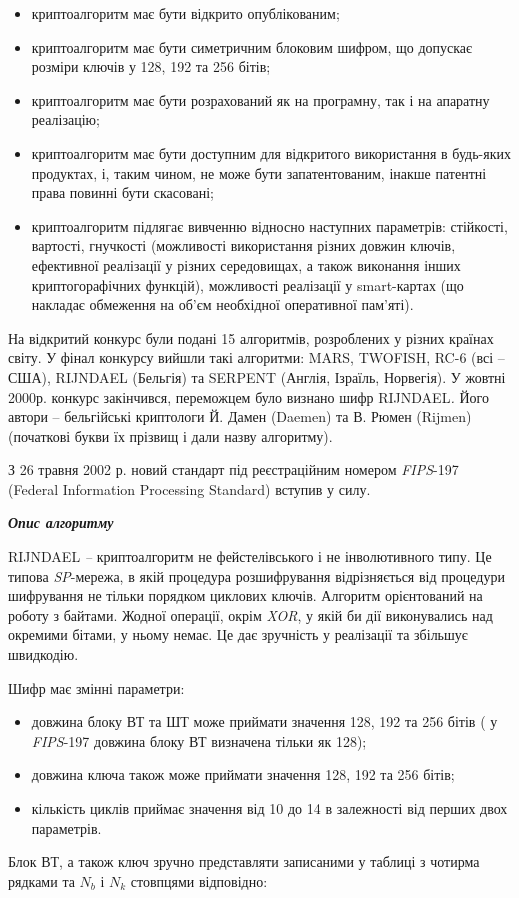\documentclass[a4paper]{article}
\newcommand\liststyleWWviiiNumxxvi{%
\renewcommand\labelitemi{\textlatin{[F0B7?]}}
\renewcommand\labelitemii{o}
\renewcommand\labelitemiii{\textlatin{[F0A7?]}}
\renewcommand\labelitemiv{\textlatin{[F0B7?]}}
}
\newcommand\liststyleWWviiiNumxxxviii{%
\renewcommand\labelitemi{\textlatin{[F0B7?]}}
\renewcommand\labelitemii{o}
\renewcommand\labelitemiii{\textlatin{[F0A7?]}}
\renewcommand\labelitemiv{\textlatin{[F0B7?]}}
}
\newcounter{}
\begin{document}
\liststyleWWviiiNumxxvi
\begin{itemize}
\item криптоалгоритм має бути відкрито опублікованим;
\item криптоалгоритм має бути симетричним блоковим шифром,  що допускає розміри
ключів у 128, 192 та 256 бітів;
\item криптоалгоритм має бути розрахований як на програмну, так і на апаратну
реалізацію;
\item криптоалгоритм має бути доступним для відкритого використання в будь-яких
продуктах, і, таким чином, не може бути запатентованим, інакше патентні права
повинні бути скасовані;
\item криптоалгоритм підлягає вивченню відносно наступних параметрів: стійкості,
вартості, гнучкості (можливості використання різних довжин ключів, ефективної
реалізації у різних середовищах, а також виконання інших криптогорафічних
функцій), можливості реалізації у smart{}-картах (що накладає обмеження на
об’єм необхідної оперативної пам’яті).
\end{itemize}
На відкритий конкурс були подані 15 алгоритмів, розроблених у різних країнах
світу. У фінал конкурсу вийшли такі алгоритми: MARS, TWOFISH, RC{}-6 (всі –
США), RIJNDAEL (Бельгія) та SERPENT\textit{ }(Англія, Ізраїль, Норвегія). У
жовтні 2000р. конкурс закінчився, переможцем було визнано шифр
RIJNDAEL\textit{.} Його автори – бельгійські криптологи Й. Дамен (Daemen) та В.
Рюмен (Rijmen) (початкові букви їх прізвищ і дали назву алгоритму). 

З 26 травня 2002 р. новий стандарт під реєстраційним номером 
\textit{FIPS}{}-197 (Federal Information Processing Standard) вступив у силу.


\bigskip


\bigskip

{\centering\bfseries\itshape
Опис алгоритму
\par}


\bigskip

RIJNDAEL\textit{ – }криптоалгоритм не фейстелівського і не інволютивного типу.
Це типова \textit{SP}{}-мережа, в якій процедура розшифрування відрізняється
від процедури шифрування не тільки порядком циклових ключів. Алгоритм
орієнтований на роботу з байтами. Жодної операції, окрім \textit{XOR}, у якій
би дії виконувались над окремими бітами, у ньому немає. Це дає зручність у
реалізації та збільшує швидкодію.

Шифр має змінні параметри:

\liststyleWWviiiNumxxxviii
\begin{itemize}
\item довжина блоку ВТ та ШТ може приймати значення 128, 192 та 256 бітів  ( у
\textit{FIPS}{}-197 довжина блоку ВТ визначена тільки як 128);
\item довжина ключа також може приймати значення 128, 192 та 256 бітів;
\item кількість циклів приймає значення від 10 до 14 в залежності від перших
двох параметрів.
\end{itemize}
Блок ВТ, а також ключ зручно представляти записаними у таблиці з чотирма рядками
та  ${N_{{b}}}$ і  ${N_{{k}}}$ стовпцями відповідно:
\end{document}
